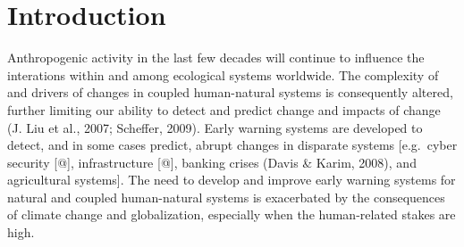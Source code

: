 \documentclass[12pt,twoside,openany]{reedthesis}
\begin{document}
\chapter{Introduction}\label{intro}

Anthropogenic activity in the last few decades will continue to
influence the interations within and among ecological systems worldwide.
The complexity of and drivers of changes in coupled human-natural
systems is consequently altered, further limiting our ability to detect
and predict change and impacts of change (J. Liu et al., 2007; Scheffer,
2009). Early warning systems are developed to detect, and in some cases
predict, abrupt changes in disparate systems {[}e.g.~cyber security
{[}@{]}, infrastructure {[}@{]}, banking crises (Davis \& Karim, 2008),
and agricultural systems{]}. The need to develop and improve early
warning systems for natural and coupled human-natural systems is
exacerbated by the consequences of climate change and globalization,
especially when the human-related stakes are high.
\end{document}
